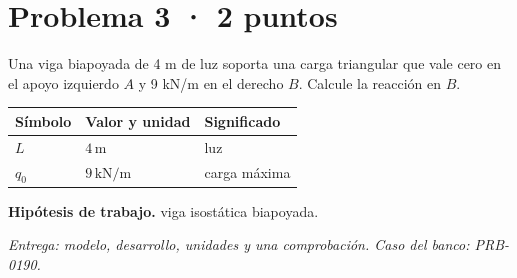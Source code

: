 \par\medskip\noindent\begin{minipage}{\linewidth}

\section{Problema 3 · 2 puntos}

Una viga biapoyada de 4 m de luz soporta una carga triangular que vale cero en el apoyo izquierdo $A$ y 9 kN/m en el derecho $B$. Calcule la reacción en $B$.

\par\medskip\noindent\begin{tabular}{@{}p{.18\linewidth}p{.26\linewidth}p{.48\linewidth}@{}}
\toprule Símbolo & Valor y unidad & Significado\\\midrule
$L$ & $4\,\mathrm{m}$ & luz\\
$q_{0}$ & $9\,\mathrm{kN/m}$ & carga máxima\\
\bottomrule\end{tabular}\par\medskip



\par\textbf{Hipótesis de trabajo.} viga isostática biapoyada.

\par\textit{Entrega: modelo, desarrollo, unidades y una comprobación. Caso del banco: PRB-0190.}\end{minipage}\par\medskip

